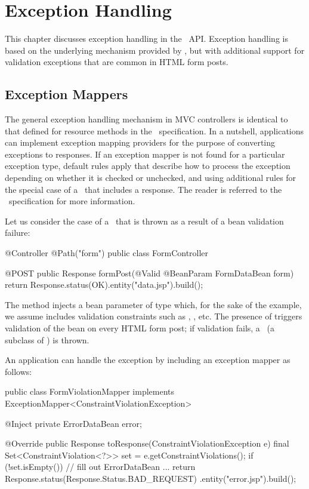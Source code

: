\chapter{Exception Handling}
\label{exception_handling}

This chapter discusses exception handling in the \mvc\ API. Exception handling is based
on the underlying mechanism provided by \jaxrs, but with additional support for 
validation exceptions that are common in HTML form posts.

\section{Exception Mappers}
\label{exception_mappers}

The general exception handling mechanism in MVC controllers is identical to that defined
for resource methods in the \jaxrs\ specification. In a nutshell, applications can 
implement exception mapping providers for the purpose of converting exceptions to 
responses. If an exception mapper is not found for a particular exception type, 
default rules apply that describe how to process the exception depending on whether
it is checked or unchecked, and using additional rules for
the special case of a \WebAppExc\ that includes a response. The reader is referred
to the \jaxrs\ specification for more information.

Let us consider the case of a \ConstVioExc\ that is thrown as a result of a bean validation
failure:

\begin{listing}{1}
@Controller
@Path("form")
public class FormController {

    @POST
    public Response formPost(@Valid @BeanParam FormDataBean form) {
        return Response.status(OK).entity("data.jsp").build();    
    }
}
\end{listing}

The method  injects a bean parameter of type 
which, for the sake of the example, we assume includes validation constraints
such as , , etc. The presence of  triggers
validation of the bean on every HTML form post; if validation fails, a 
\ConstVioExc\ (a subclass of \ValExc) is thrown. 

An application can handle the exception by including an exception mapper as follows:

\begin{listing}{1}
public class FormViolationMapper 
             implements ExceptionMapper<ConstraintViolationException> {

    @Inject
    private ErrorDataBean error;

    @Override
    public Response toResponse(ConstraintViolationException e) {
        final Set<ConstraintViolation<?>> set = e.getConstraintViolations();
        if (!set.isEmpty()) {
            // fill out ErrorDataBean ...
        }
        return Response.status(Response.Status.BAD_REQUEST)
                       .entity("error.jsp").build();
    }
}
\end{listing}

